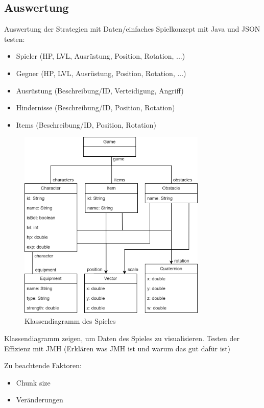 \subsection{Auswertung}
Auswertung der Strategien mit Daten/einfaches Spielkonzept mit Java und JSON testen:
\begin{itemize}
    \item Spieler (HP, LVL, Ausrüstung, Position, Rotation, ...)
    \item Gegner (HP, LVL, Ausrüstung, Position, Rotation, ...)
    \item Ausrüstung (Beschreibung/ID, Verteidigung, Angriff)
    \item Hindernisse (Beschreibung/ID, Position, Rotation)
    \item Items (Beschreibung/ID, Position, Rotation)
\end{itemize}

\begin{figure}[htp]
    \centering
    \includegraphics[width=0.8\textwidth]{images/Klassendiagramm.png}
    \caption{Klassendiagramm des Spieles}
    \label{fig:classDia}
\end{figure}

Klassendiagramm zeigen, um Daten des Spieles zu visualisieren. Testen der Effizienz mit JMH (Erklären was JMH ist und warum das gut dafür ist)

Zu beachtende Faktoren:
\begin{itemize}
    \item Chunk size
    \item Veränderungen
\end{itemize}
